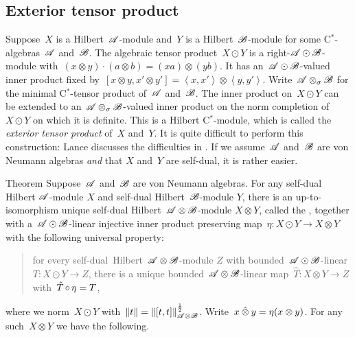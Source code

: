 \documentclass[b]{subfiles}
\begin{document}
\subsection{Exterior tensor product}
\begin{parsec}%
\begin{point}%
Suppose~$X$ is a Hilbert~$\mathscr{A}$-module
    and~$Y$ is a Hilbert~$\mathscr{B}$-module
    for some C$^*$-algebras~$\mathscr{A}$ and~$\mathscr{B}$.
The algebraic tensor product~$X \odot Y$
    is a right-$\mathscr{A} \odot \mathscr{B}$-module
    with~$(x\otimes y)\cdot (a\otimes b) = (xa) \otimes (yb)$.
It has an~$\mathscr{A} \odot \mathscr{B}$-valued inner
    product fixed by~$[x\otimes y, x'\otimes y']
        = \left<x,x'\right> \otimes \left<y,y'\right>$.
Write~$\mathscr{A} \otimes_\sigma \mathscr{B}$ for the minimal
    C$^*$-tensor product of~$\mathscr{A}$ and~$\mathscr{B}$.
The inner product on~$X \odot Y$ can be extended
    to an~$\mathscr{A} \otimes_\sigma \mathscr{B}$-valued inner product
    on the norm completion of~$X \odot Y$
    on which it is definite.
This is a Hilbert C$^*$-module,
    which is called the \emph{exterior tensor product} of~$X$ and~$Y$.
It is quite difficult to perform this construction:
    Lance discusses the difficulties in \cite[Ch.~4]{lance}.
If we assume~$\mathscr{A}$ and~$\mathscr{B}$ are von Neumann algebras
    \emph{and} that $X$ and~$Y$ are self-dual,
    it is rather easier.
\end{point}
\begin{point}{Theorem}%
Suppose~$\mathscr{A}$ and~$\mathscr{B}$ are von Neumann algebras.
For any self-dual Hilbert $\mathscr{A}$-module $X$
    and self-dual Hilbert~$\mathscr{B}$-module $Y$,
    there is an up-to-isomorphism unique
    self-dual Hilbert~$\mathscr{A}\otimes \mathscr{B}$-module
    $X \otimes Y$, called the ,
    together with a~$\mathscr{A} \odot \mathscr{B}$-linear injective
    inner product preserving map~$\eta \colon X \odot Y \to X\otimes Y$
    with the following universal property:
    \begin{quote}
    for every self-dual~Hilbert~$\mathscr{A}\otimes\mathscr{B}$-module
    $Z$ with bounded~$\mathscr{A} \odot \mathscr{B}$-linear
        $T\colon X \odot Y \to Z$,
    there is a unique bounded~$\mathscr{A} \otimes \mathscr{B}$-linear
        map~$\hat{T}\colon X \otimes Y \to Z$
    with~$\hat{T} \mathop{\circ} \eta= T$,
    \end{quote}
where we norm~$X \odot Y$ with~$\|t \| = \|[t,t]\|^{\frac{1}{2}}_{\mathscr{A}\otimes \mathscr{B}}$.
Write~$x \mathbin{\hat{\otimes}} y = \eta(x\otimes y)$.
For any such~$X \otimes Y$ we have the following.
\begin{enumerate}

\end{enumerate}
\end{point}
\end{parsec}
\end{document}
